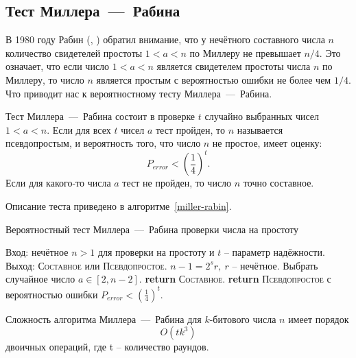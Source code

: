 \subsection{Тест Миллера~---~Рабина}\label{section-prime-check-miller-rabin}

В 1980 году Рабин (, \cite{Rabin:1980}) обратил внимание, что у нечётного составного числа $n$ количество свидетелей простоты $1 < a < n$ по Миллеру не превышает $n/4$. Это означает, что если число $1 < a < n$ является свидетелем простоты числа $n$ по Миллеру, то число $n$ является простым с вероятностью ошибки не более чем $1/4$. Что приводит нас к вероятностному тесту Миллера~---~Рабина.

Тест Миллера~---~Рабина состоит в проверке $t$ случайно выбранных чисел $1 < a < n$. Если для всех $t$ чисел $a$ тест пройден, то $n$ называется псевдопростым, и вероятность того, что число $n$ не простое, имеет оценку:
    \[ P_{error} < \left( \frac{1}{4} \right)^t. \]
Если для какого-то числа $a$ тест не пройден, то число $n$ точно составное.

Описание теста приведено в алгоритме~\ref{miller-rabin}.

\begin{algorithm}[ht]
    \caption{Вероятностный тест Миллера~---~Рабина проверки числа на простоту\label{miller-rabin}}
    \begin{algorithmic}
        \STATE Вход: нечётное $n>1$ для проверки на простоту и $t$ -- параметр надёжности.
        \STATE Выход: \textsc{Составное} или \textsc{Псевдопростое}.
        \STATE $n - 1 = 2^s r, ~ r$ -- нечётное.
            \STATE Выбрать случайное число $a \in [2, n-2]$.
               \STATE \textbf{return} \textsc{Составное}.
           \ENDIF
        \ENDFOR
       \STATE \textbf{return} \textsc{Псевдопростое} с вероятностью ошибки $P_{error} < \left( \frac{1}{4} \right)^t$.
    \end{algorithmic}
\end{algorithm}

Сложность алгоритма Миллера~---~Рабина для $k$-битового числа $n$ имеет порядок
    \[ O(t k^3) \]
двоичных операций, где t -- количество раундов.

